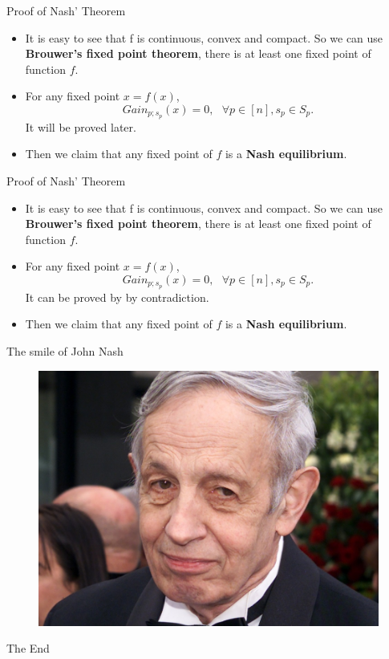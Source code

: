 \documentclass{beamer}
\begin{document}
\begin{frame}[fragile]{Proof of Nash' Theorem}
	\begin{itemize}[<+->]
		\item It is easy to see that f is continuous, convex and compact. So we can use \textbf{Brouwer’s fixed point theorem}, there is at least one fixed point of function $f$.
		\item For any fixed point $x=f(x)$, 
		\begin{equation}
		Gain_{p;s_p}(x) = 0, \ \ \  \forall p\in [n], s_p \in S_p .\nonumber
		\end{equation}
	It will be proved later.
	\item Then we claim that any fixed point of $f$ is a \textbf{Nash equilibrium}.
	\end{itemize}
\end{frame}

\begin{frame}[fragile]{Proof of Nash' Theorem}
	\begin{itemize}[<+->]
		\item It is easy to see that f is continuous, convex and compact. So we can use \textbf{Brouwer’s fixed point theorem}, there is at least one fixed point of function $f$.
		\item For any fixed point $x=f(x)$, 
		\begin{equation}
		Gain_{p;s_p}(x) = 0, \ \ \  \forall p\in [n], s_p \in S_p .\nonumber
		\end{equation}
		It can be proved by by contradiction.
		\item Then we claim that any fixed point of $f$ is a \textbf{Nash equilibrium}.
	\end{itemize}
\end{frame}

\begin{frame}[fragile]{The smile of John Nash}
	\begin{figure}[H]
		\centering
		\includegraphics[width=0.7\linewidth]{002.jpeg}\vspace{-10pt}
		\nonumber\vspace{-10pt}
	\end{figure}
\end{frame}


\begin{frame}
\Huge{\centerline{The End}}
\end{frame}
\end{document}
